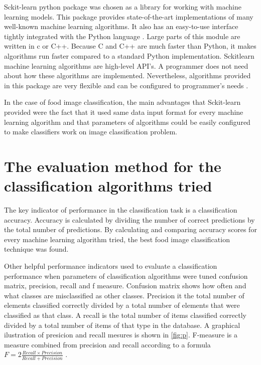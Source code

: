 Sckit-learn python package was chosen as a library for working with machine learning models. This package provides state-of-the-art implementations of many well-known machine learning algorithms. It also has an easy-to-use interface tightly integrated with the Python language \citep{pedregosa2011scikit}. Large parts of this module are written in c or C++. Because C and C++ are much faster than Python, it makes algorithms run faster compared to a standard Python implementation. Sckit\-learn machine learning algorithms are high-level API's.  A programmer does not need about how these algorithms are implemented. Nevertheless, algorithms provided in this package are very flexible and can be configured to programmer's needs \citep{buitinck2013api}.

In the case of food image classification, the main advantages that Sckit-learn provided were the fact that it used same data input format for every machine learning algorithm and that parameters of algorithms could be easily configured to make classifiers work on image classification problem.


\section{The evaluation method for the classification algorithms tried}

The key indicator of performance in the classification task is a classification accuracy. Accuracy is calculated by dividing the number of correct predictions by the total number of predictions. By calculating and comparing accuracy scores for every machine learning algorithm tried, the best food image classification technique was found.

Other helpful performance indicators used to evaluate a classification performance when parameters of classification algorithms were tuned confusion matrix, precision, recall and f measure. Confusion matrix shows how often and what classes are misclassified as other classes. Precision it the total number of elements classified correctly divided by a total number of elements that were classified as that class. A recall is the total number of items classified correctly divided by a total number of items of that type in the database. A graphical ilustration of presicion and recall mesures is shown in \autoref{fig:p}.  F-measure is a measure combined from precision and recall according to a formula \( F = 2 \frac{Recall \times Precision }{Recall  +  Precision} \)   \citep{ting2011}. 


